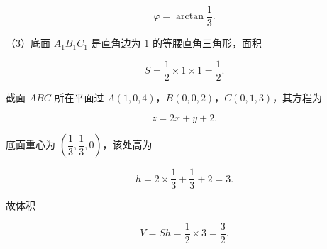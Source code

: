 \begin{answer}
\nopagebreak[4]
\[\varphi=\arctan\frac13.\]

（3）底面 $A_1B_1C_1$ 是直角边为 $1$ 的等腰直角三角形，面积

\nopagebreak[4]
\[S=\frac12\times1\times1=\frac12.\]

截面 $ABC$ 所在平面过 $A(1,0,4)$，$B(0,0,2)$，$C(0,1,3)$，其方程为

\nopagebreak[4]
\[z=2x+y+2.\]

底面重心为 $\left(\dfrac13,\dfrac13,0\right)$，该处高为

\nopagebreak[4]
\[h=2\times\frac13+\frac13+2=3.\]

故体积

\nopagebreak[4]
\[V=Sh=\frac12\times3=\frac32.\]


\end{answer}
